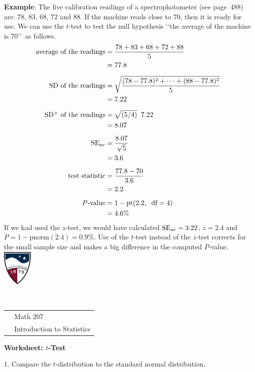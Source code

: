 \documentclass[10pt]{article}
\begin{document}
\textbf{Example}:
The five calibration readings of a spectrophotometer (see page~488) are:
78, 83, 68, 72 and 88.  If the machine reads close to 70, then it is ready for
use.  We can use the $t$-test 
to test the null hypothesis \lq\lq the average of the machine is 70\rq\rq\ as
follows.
\begin{align*}
\mbox{average of the readings} &= \frac{78+83+68+72+88}{5}\\ & = 77.8\\[5pt]
\mbox{SD of the readings}      &=\sqrt{\frac{(78-77.8)^2 + \cdots + (88-77.8)^2}{5}}\\
   &= 7.22\\[5pt]
\mbox{SD$^+$ of the readings}   &=\sqrt{(5/4)}\;\;7.22 \\ &= 8.07\\[5pt]
\mbox{SE}_{\mbox{\scriptsize av}}    &= \frac{8.07}{\sqrt{5}}\\ &= 3.6\\[5pt]
\mbox{test statistic}          &= \frac{77.8-70}{3.6}\\ & = 2.2\\[5pt]
\mbox{$P$-value}               &= 1-\mbox{pt}(2.2,\;\;\mbox{df}=4)\\ &= 4.6\%
\end{align*}
If we had used the $z$-test, we would have calculated
$\mbox{SE}_{\scriptsize\mbox{av}}=3.22$, $z=2.4$ and $P=1-\mbox{pnorm}(2.4)=0.9$\%.
Use of the $t$-test instead of the $z$-test corrects for the small sample size
and makes a big difference in the computed $P$-value.
\vfill
\eject
\href{http://www.su.edu}{\includegraphics[height=1.75cm]{sulogo.eps}}
\vspace{-1.79cm}

{{\ }\hfill\small
\begin{tabular}{cl}
& Math 207\\
& Introduction to Statistics\\
\end{tabular}
}
\medskip

\begin{center}
\textbf{\large  Worksheet:  $t$-Test}
\end{center}
\smallskip

1. Compare the $t$-distribution to the standard normal distribution.
\end{document}
